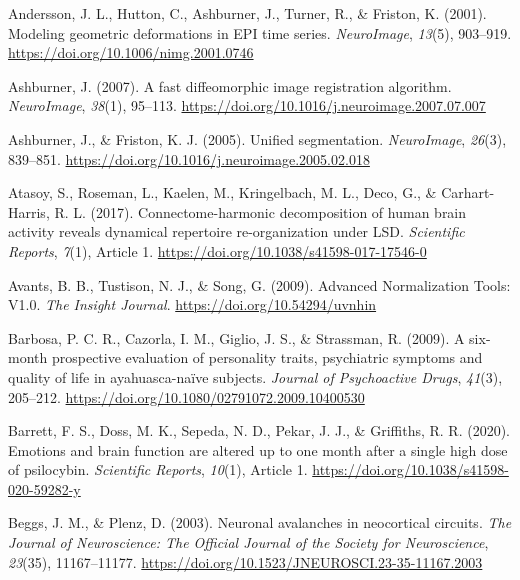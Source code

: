 \label{refs}
\begin{CSLReferences}{1}{0}
Andersson, J. L., Hutton, C., Ashburner, J., Turner, R., \& Friston, K.
(2001). Modeling geometric deformations in EPI time series.
\emph{NeuroImage}, \emph{13}(5), 903--919.
\url{https://doi.org/10.1006/nimg.2001.0746}

Ashburner, J. (2007). A fast diffeomorphic image registration algorithm.
\emph{NeuroImage}, \emph{38}(1), 95--113.
\url{https://doi.org/10.1016/j.neuroimage.2007.07.007}

Ashburner, J., \& Friston, K. J. (2005). Unified segmentation.
\emph{NeuroImage}, \emph{26}(3), 839--851.
\url{https://doi.org/10.1016/j.neuroimage.2005.02.018}

Atasoy, S., Roseman, L., Kaelen, M., Kringelbach, M. L., Deco, G., \&
Carhart-Harris, R. L. (2017). Connectome-harmonic decomposition of human
brain activity reveals dynamical repertoire re-organization under LSD.
\emph{Scientific Reports}, \emph{7}(1), Article 1.
\url{https://doi.org/10.1038/s41598-017-17546-0}

Avants, B. B., Tustison, N. J., \& Song, G. (2009). Advanced
Normalization Tools: V1.0. \emph{The Insight Journal}.
\url{https://doi.org/10.54294/uvnhin}

Barbosa, P. C. R., Cazorla, I. M., Giglio, J. S., \& Strassman, R.
(2009). A six-month prospective evaluation of personality traits,
psychiatric symptoms and quality of life in ayahuasca-naïve subjects.
\emph{Journal of Psychoactive Drugs}, \emph{41}(3), 205--212.
\url{https://doi.org/10.1080/02791072.2009.10400530}

Barrett, F. S., Doss, M. K., Sepeda, N. D., Pekar, J. J., \& Griffiths,
R. R. (2020). Emotions and brain function are altered up to one month
after a single high dose of psilocybin. \emph{Scientific Reports},
\emph{10}(1), Article 1.
\url{https://doi.org/10.1038/s41598-020-59282-y}

Beggs, J. M., \& Plenz, D. (2003). Neuronal avalanches in neocortical
circuits. \emph{The Journal of Neuroscience: The Official Journal of the
Society for Neuroscience}, \emph{23}(35), 11167--11177.
\url{https://doi.org/10.1523/JNEUROSCI.23-35-11167.2003}


\end{CSLReferences}
